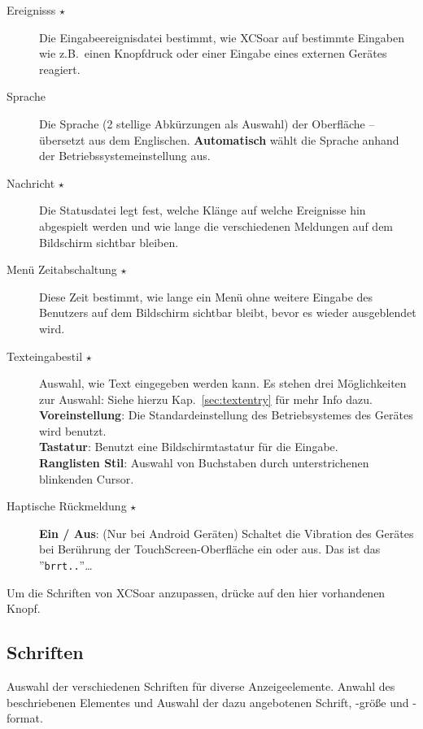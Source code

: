 \begin{description}
\item[Ereignisss $\star$]  Die Eingabeereignisdatei bestimmt, wie \textsf{XCSoar} auf bestimmte Eingaben wie z.B.\ einen Knopfdruck oder einer
Eingabe eines externen Gerätes reagiert.
\item[Sprache]  Die Sprache (2 stellige Abkürzungen als Auswahl) der Oberfläche -- übersetzt aus dem Englischen.
{\bf Automatisch} wählt die Sprache anhand der Betriebssystemeinstellung aus.
\item[Nachricht $\star$] Die Statusdatei legt fest, welche Klänge auf welche Ereignisse hin abgespielt werden
und wie lange die verschiedenen Meldungen auf dem Bildschirm sichtbar bleiben.
\item[Menü Zeitabschaltung $\star$] Diese Zeit bestimmt, wie lange ein Menü ohne weitere Eingabe des Benutzers auf
dem Bildschirm sichtbar bleibt, bevor es wieder ausgeblendet wird.
\item[Texteingabestil $\star$]  Auswahl, wie Text eingegeben werden kann. Es stehen drei Möglichkeiten zur Auswahl:
  Siehe hierzu Kap.~\ref{sec:textentry} für mehr Info dazu. \\
    {\bf Voreinstellung}: Die Standardeinstellung des Betriebsystemes des Gerätes wird benutzt.\\
    {\bf Tastatur}: Benutzt eine Bildschirmtastatur  für die Eingabe.  \\
    {\bf Ranglisten Stil}: Auswahl von Buchstaben durch unterstrichenen blinkenden Cursor.
\item[Haptische Rückmeldung $\star$]  {\bf Ein / Aus}: (Nur bei Android Geräten) Schaltet die Vibration des Gerätes bei Berührung der TouchScreen-Oberfläche  ein oder aus. Das ist das ''\texttt{brrt..}''\dots
\end{description}



Um die Schriften von \textsf{XCSoar} anzupassen, drücke auf den hier vorhandenen   Knopf.

\subsection*{Schriften}

Auswahl der verschiedenen Schriften für diverse Anzeigeelemente. Anwahl des beschriebenen
Elementes und Auswahl der dazu angebotenen Schrift, -größe und -format.

